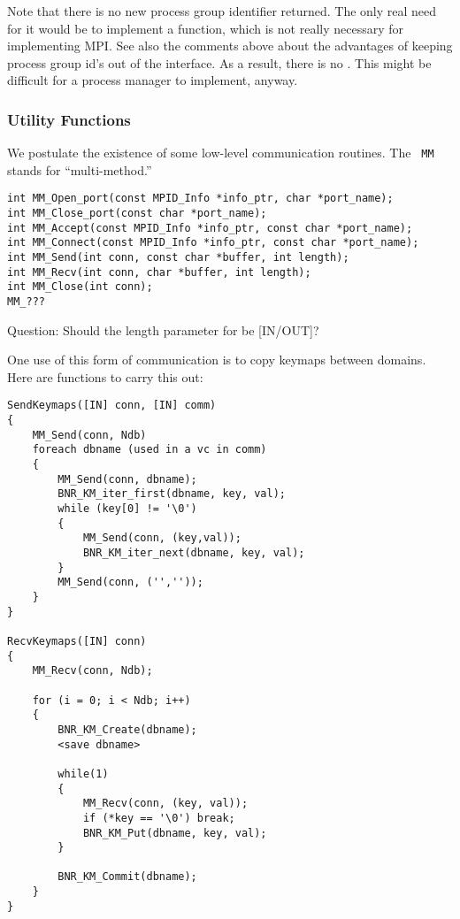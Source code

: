 \documentclass{article}
\begin{document}
Note that there is no new process group identifier returned.  The only real
need for it would be to implement a  function, which is not
really necessary for implementing MPI.  See also the comments above about the
advantages of keeping process group id's out of the interface.  As a result,
there is no .  This might be difficult for a process manager to
implement, anyway. 

\subsubsection{Utility Functions}

We postulate the existence of some low-level communication routines.  The {\tt
  MM} stands for ``multi-method.''

\begin{verbatim}
int MM_Open_port(const MPID_Info *info_ptr, char *port_name);
int MM_Close_port(const char *port_name);
int MM_Accept(const MPID_Info *info_ptr, const char *port_name);
int MM_Connect(const MPID_Info *info_ptr, const char *port_name);
int MM_Send(int conn, const char *buffer, int length);
int MM_Recv(int conn, char *buffer, int length);
int MM_Close(int conn);
MM_???
\end{verbatim}
Question: Should the length parameter for  be [IN/OUT]?

One use of this form of communication is to copy keymaps between domains.
Here are functions to carry this out:

\begin{verbatim}
SendKeymaps([IN] conn, [IN] comm)
{
    MM_Send(conn, Ndb)
    foreach dbname (used in a vc in comm)
    {
        MM_Send(conn, dbname);
        BNR_KM_iter_first(dbname, key, val);
        while (key[0] != '\0')
        {
            MM_Send(conn, (key,val));
            BNR_KM_iter_next(dbname, key, val);
        }
        MM_Send(conn, ('',''));
    }
}

RecvKeymaps([IN] conn)
{
    MM_Recv(conn, Ndb);
    
    for (i = 0; i < Ndb; i++)
    {
        BNR_KM_Create(dbname);
        <save dbname>
        
        while(1)
        {
            MM_Recv(conn, (key, val));
            if (*key == '\0') break;
            BNR_KM_Put(dbname, key, val);
        }

        BNR_KM_Commit(dbname);
    }
}
\end{verbatim}
\end{document}
